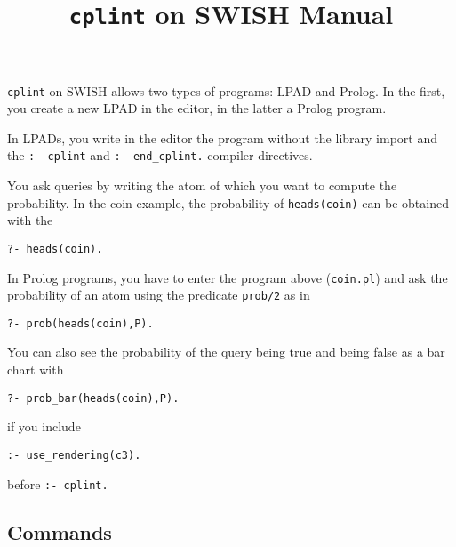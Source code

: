 \documentclass[a4paper,10pt]{article}
\begin{document}
\title{\texttt{cplint} on SWISH Manual}
\maketitle

%





\verb|cplint| on SWISH allows two types of programs: LPAD and Prolog. In the first, you create a new LPAD in the editor, in the latter a Prolog program. 

In LPADs, you write in the editor the program without the library import and the \verb|:- cplint| and \verb|:- end_cplint.| compiler directives.

You ask queries by writing the atom of which you want to compute the probability. In the coin example, the probability of \verb|heads(coin)| can be obtained with the 
\begin{verbatim}
?- heads(coin).
\end{verbatim}

In Prolog programs, you have to enter the program above (\verb|coin.pl|) and ask the probability of an atom using the predicate \verb|prob/2| as in
\begin{verbatim}
?- prob(heads(coin),P).
\end{verbatim}
You can also see the probability of the query being true and 
being false as a bar chart with
\begin{verbatim}
?- prob_bar(heads(coin),P).
\end{verbatim}
if you include
\begin{verbatim}
:- use_rendering(c3).
\end{verbatim}
before \verb|:- cplint.|




\subsection{Commands}
\end{document}
